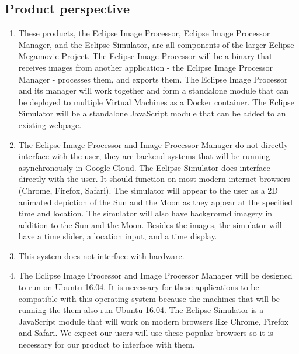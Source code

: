 \documentclass[10pt, onecolumn, draftclsnofoot, letterpaper, compsoc]{IEEEtran}
\begin{document}
\subsection{Product perspective}
	\begin{enumerate}
		\item These products, the Eclipse Image Processor, Eclipse Image
		Processor Manager, and the Eclipse Simulator, are all components of
		the larger Eclipse Megamovie Project. The Eclipse Image Processor will be
		a binary that receives images from another application - the Eclipse
		Image Processor Manager - processes them, and exports them. The Eclipse
		Image Processor and its manager will work together and form a standalone module
		that can be deployed to multiple Virtual Machines as a Docker container.
		The Eclipse Simulator will be a standalone JavaScript module that can be added to an
		existing webpage.

		\item The Eclipse Image Processor and Image Processor Manager
		do not directly interface with the user, they are backend
		systems that will be running asynchronously in Google Cloud.
		The Eclipse Simulator does interface
		directly with the user. It should function on most modern
		internet browsers (Chrome, Firefox, Safari). The simulator
		will appear to the user as a 2D animated depiction of the
		Sun and the Moon as they appear at the specified time and
		location. The simulator will also have background imagery in
		addition to the Sun and the Moon. Besides the images, the
		simulator will have a time slider, a location input, and a
		time display.

		\item This system does not interface with hardware.

		\item The Eclipse Image Processor and Image Processor Manager
		will be designed to run on Ubuntu 16.04. It is necessary for these
		applications to be compatible with this operating system because
		the machines that will be running the them also run Ubuntu 16.04. The Eclipse
		Simulator is a JavaScript module that will work on modern
		browsers like Chrome, Firefox and Safari. We expect our
		users will use these popular browsers so it is necessary
		for our product to interface with them.
	\end{enumerate}
\end{document}
